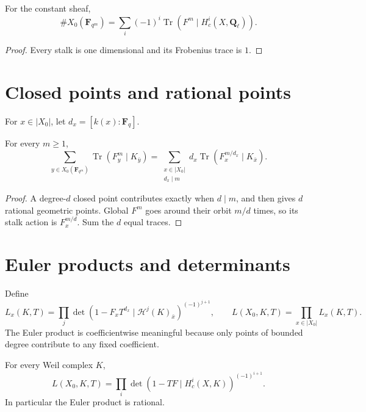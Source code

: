 \begin{corollary}
\label{cor:point-count-trace}
For the constant sheaf,
\[
 \#X_0(\mathbf F_{q^m})
 =\sum_i(-1)^i\operatorname{Tr}
 (F^m\mid H_c^i(X,\mathbf Q_\ell)).
\]
\end{corollary}

\begin{proof}
Every stalk is one dimensional and its Frobenius trace is \(1\).
\end{proof}

\section{Closed points and rational points}

For \(x\in|X_0|\), let \(d_x=[k(x):\mathbf F_q]\).

\begin{lemma}
\label{lem:closed-rational-traces}
For every \(m\geq1\),
\[
 \sum_{y\in X_0(\mathbf F_{q^m})}
 \operatorname{Tr}(F_y^m\mid K_{\bar y})
 =
 \sum_{\substack{x\in|X_0|\\d_x\mid m}}
 d_x\operatorname{Tr}(F_x^{m/d_x}\mid K_{\bar x}).
\]
\end{lemma}

\begin{proof}
A degree-\(d\) closed point contributes exactly when \(d\mid m\), and then
gives \(d\) rational geometric points.  Global \(F^m\) goes around their
orbit \(m/d\) times, so its stalk action is \(F_x^{m/d}\).  Sum the \(d\)
equal traces.
\end{proof}

\section{Euler products and determinants}

Define
\[
 L_x(K,T)
 =\prod_j\det(1-F_xT^{d_x}\mid
 \mathcal H^j(K)_{\bar x})^{(-1)^{j+1}},
\qquad
 L(X_0,K,T)=\prod_{x\in|X_0|}L_x(K,T).
\]
The Euler product is coefficientwise meaningful because only points of
bounded degree contribute to any fixed coefficient.

\begin{theorem}
\label{thm:cohomological-L}
For every Weil complex \(K\),
\[
 \boxed{\;
 L(X_0,K,T)
 =
 \prod_i\det(1-TF\mid H_c^i(X,K))^{(-1)^{i+1}}.
 \;}
\]
In particular the Euler product is rational.
\end{theorem}

